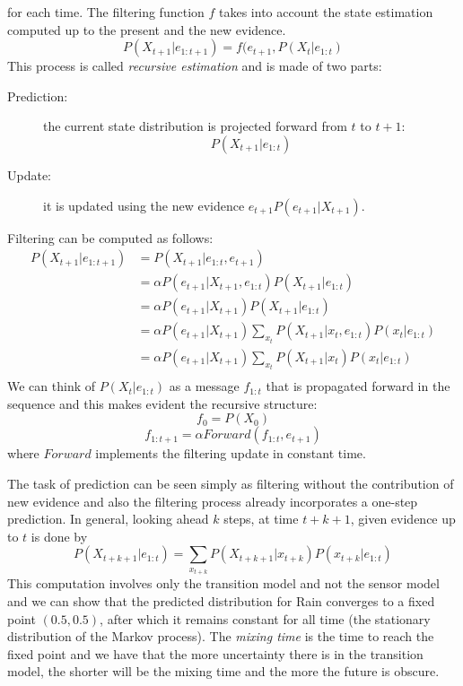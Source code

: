 for each time.\newline
The filtering function $f$ takes into account the state estimation computed up to the
present and the new evidence.
\[ P(X_{t+1} | e_{1:t+1}) = f(e_{t+1}, P(X_t | e_{1:t}) \]
This process is called \emph{recursive estimation} and is made of two parts:
\begin{description}
   \item [Prediction: ] the current state distribution is projected forward from $t$ to $t+1$:
	   \[ P(X_{t+1} | e_{1:t}) \]
   \item [Update: ] it is updated using the new evidence $e_{t+1} P(e_{t+1} | X_{t+1})$.
\end{description}
Filtering can be computed as follows:
\begin{align*}
    P(X_{t+1} | e_{1:t+1}) & = P(X_{t+1} | e_{1:t}, e_{t+1}) \\
	                   & = \alpha P(e_{t+1} | X_{t+1}, e_{1:t}) P(X_{t+1} | e_{1:t}) \\
			   & = \alpha P(e_{t+1} | X_{t+1}) P(X_{t+1} | e_{1:t}) \\
			   & = \alpha P(e_{t+1} | X_{t+1}) \sum_{x_t} P(X_{t+1}| x_t, e_{1:t})
			                                               P(x_t | e_{1:t}) \\
			   & = \alpha P(e_{t+1}|X_{t+1}) \sum_{x_t} P(X_{t+1} | x_t) 
			                                            P(x_t | e_{1:t}) \\
\end{align*}
We can think of $P(X_t|e_{1:t})$ as a message $f_{1:t}$ that is propagated forward
in the sequence and this makes evident the recursive structure:
\[ f_0 = P(X_0) \]
\[ f_{1:t+1} = \alpha Forward(f_{1:t}, e_{t+1}) \]
where $Forward$ implements the filtering update in constant time.

The task of prediction can be seen simply as filtering without the contribution of new
evidence and also the filtering process already incorporates a one-step prediction.\newline
In general, looking ahead $k$ steps, at time $t+k+1$, given evidence up to $t$ is done by
\[ P(X_{t+k+1} | e_{1:t}) = \sum _{x_{t+k}} P(X_{t+k+1} | x_{t+k}) P(x_{t+k} | e_{1:t}) \]
This computation involves only the transition model and not the sensor model and 
we can show that the predicted distribution for Rain converges to a fixed point $(0.5, 0.5)$,
after which it remains constant for all time (the stationary distribution of the
Markov process).\newline
The \emph{mixing time} is the time to reach the fixed point and we have that the more
uncertainty there is in the transition model, the shorter will be the mixing time
and the more the future is obscure.

